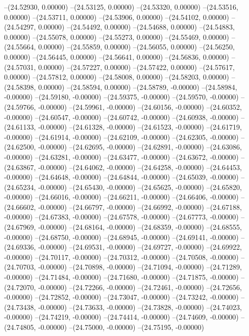 --(24.52930, 0.00000)
--(24.53125, 0.00000)
--(24.53320, 0.00000)
--(24.53516, 0.00000)
--(24.53711, 0.00000)
--(24.53906, 0.00000)
--(24.54102, 0.00000)
--(24.54297, 0.00000)
--(24.54492, 0.00000)
--(24.54688, 0.00000)
--(24.54883, 0.00000)
--(24.55078, 0.00000)
--(24.55273, 0.00000)
--(24.55469, 0.00000)
--(24.55664, 0.00000)
--(24.55859, 0.00000)
--(24.56055, 0.00000)
--(24.56250, 0.00000)
--(24.56445, 0.00000)
--(24.56641, 0.00000)
--(24.56836, 0.00000)
--(24.57031, 0.00000)
--(24.57227, 0.00000)
--(24.57422, 0.00000)
--(24.57617, 0.00000)
--(24.57812, 0.00000)
--(24.58008, 0.00000)
--(24.58203, 0.00000)
--(24.58398, 0.00000)
--(24.58594, 0.00000)
--(24.58789, -0.00000)
--(24.58984, -0.00000)
--(24.59180, -0.00000)
--(24.59375, -0.00000)
--(24.59570, -0.00000)
--(24.59766, -0.00000)
--(24.59961, -0.00000)
--(24.60156, -0.00000)
--(24.60352, -0.00000)
--(24.60547, -0.00000)
--(24.60742, -0.00000)
--(24.60938, -0.00000)
--(24.61133, -0.00000)
--(24.61328, -0.00000)
--(24.61523, -0.00000)
--(24.61719, -0.00000)
--(24.61914, -0.00000)
--(24.62109, -0.00000)
--(24.62305, -0.00000)
--(24.62500, -0.00000)
--(24.62695, -0.00000)
--(24.62891, -0.00000)
--(24.63086, -0.00000)
--(24.63281, -0.00000)
--(24.63477, -0.00000)
--(24.63672, -0.00000)
--(24.63867, -0.00000)
--(24.64062, -0.00000)
--(24.64258, -0.00000)
--(24.64453, -0.00000)
--(24.64648, -0.00000)
--(24.64844, -0.00000)
--(24.65039, -0.00000)
--(24.65234, -0.00000)
--(24.65430, -0.00000)
--(24.65625, -0.00000)
--(24.65820, -0.00000)
--(24.66016, -0.00000)
--(24.66211, -0.00000)
--(24.66406, -0.00000)
--(24.66602, -0.00000)
--(24.66797, -0.00000)
--(24.66992, -0.00000)
--(24.67188, -0.00000)
--(24.67383, -0.00000)
--(24.67578, -0.00000)
--(24.67773, -0.00000)
--(24.67969, -0.00000)
--(24.68164, -0.00000)
--(24.68359, -0.00000)
--(24.68555, -0.00000)
--(24.68750, -0.00000)
--(24.68945, -0.00000)
--(24.69141, -0.00000)
--(24.69336, -0.00000)
--(24.69531, -0.00000)
--(24.69727, -0.00000)
--(24.69922, -0.00000)
--(24.70117, -0.00000)
--(24.70312, -0.00000)
--(24.70508, -0.00000)
--(24.70703, -0.00000)
--(24.70898, -0.00000)
--(24.71094, -0.00000)
--(24.71289, -0.00000)
--(24.71484, -0.00000)
--(24.71680, -0.00000)
--(24.71875, -0.00000)
--(24.72070, -0.00000)
--(24.72266, -0.00000)
--(24.72461, -0.00000)
--(24.72656, -0.00000)
--(24.72852, -0.00000)
--(24.73047, -0.00000)
--(24.73242, -0.00000)
--(24.73438, -0.00000)
--(24.73633, -0.00000)
--(24.73828, -0.00000)
--(24.74023, -0.00000)
--(24.74219, -0.00000)
--(24.74414, -0.00000)
--(24.74609, -0.00000)
--(24.74805, -0.00000)
--(24.75000, -0.00000)
--(24.75195, -0.00000)
